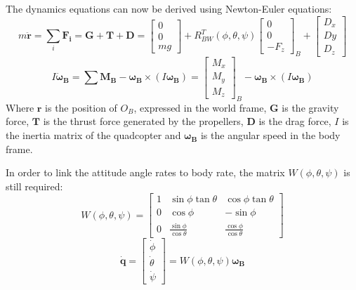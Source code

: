 \documentclass[a4paper, 12pt]{report}
\begin{document}
The dynamics equations can now be derived using Newton-Euler equations:
\[ m\boldsymbol{\ddot r} =  \sum_i \boldsymbol{F_i} = \boldsymbol{G} + \boldsymbol{T} + \boldsymbol{D} = \begin{bmatrix}  0\\ 0\\ mg \end{bmatrix} + R_{BW}^T(\phi, \theta, \psi) \begin{bmatrix}  0\\ 0\\ -F_z \end{bmatrix}_B + \begin{bmatrix}  D_x\\ Dy\\ D_z \end{bmatrix}\]
\[ I\boldsymbol{\dot \omega_B} =  \sum \boldsymbol{M_B} - \boldsymbol{\omega_B}  \times (I \boldsymbol{\omega_B} )=  
\begin{bmatrix}  M_{x}\\ M_{y}\\ M_{z} \end{bmatrix}_B - \boldsymbol{\omega_B}  \times (I \boldsymbol{\omega_B}) \]
Where $\boldsymbol{r}$ is the position of $O_B$, expressed in the world frame,  $\boldsymbol{G}$ is the gravity force, $\boldsymbol{T}$ is the thrust force generated by the propellers, $\boldsymbol{D}$ is the drag force, $I$  is the inertia matrix of the quadcopter and $\boldsymbol{\omega_B}$ is the angular speed in the body frame.

In order to link the attitude angle rates to body rate, the matrix $W(\phi,\theta,\psi)$ is still required: %
\[ W(\phi,\theta,\psi) = \begin{bmatrix}  1 & \sin\phi \tan\theta  & \cos\phi \tan\theta \\ 0 & \cos\phi  &-\sin\phi  \\ 0 & \frac{\sin\phi }{\cos\theta } & \frac{\cos\phi }{\cos\theta } \end{bmatrix}\]
\[ \boldsymbol{ \dot q} = \begin{bmatrix} \dot \phi \\ \dot \theta\\ \dot \psi \end{bmatrix} = W(\phi,\theta,\psi) \boldsymbol{\omega_B}\]
\end{document}
